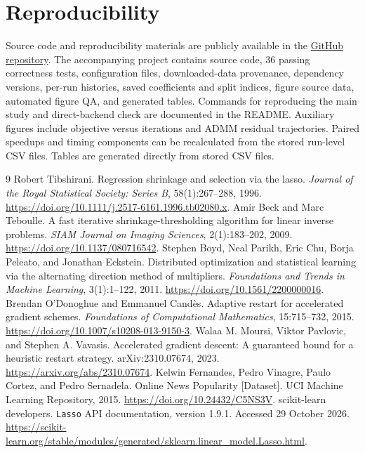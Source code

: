 \documentclass{article}
\begin{document}
\section*{Reproducibility}
Source code and reproducibility materials are publicly available in the \href{https://github.com/Yuchen-Wang-CHN/comp6704-lasso-optimization}{GitHub repository}.
The accompanying project contains source code, 36 passing correctness tests, configuration files, downloaded-data provenance, dependency versions, per-run histories, saved coefficients and split indices, figure source data, automated figure QA, and generated tables. Commands for reproducing the main study and direct-backend check are documented in the README. Auxiliary figures include objective versus iterations and ADMM residual trajectories. Paired speedups and timing components can be recalculated from the stored run-level CSV files. Tables are generated directly from stored CSV files.

\begin{thebibliography}{9}
Robert Tibshirani. Regression shrinkage and selection via the lasso. \emph{Journal of the Royal Statistical Society: Series B}, 58(1):267--288, 1996. \url{https://doi.org/10.1111/j.2517-6161.1996.tb02080.x}.
Amir Beck and Marc Teboulle. A fast iterative shrinkage-thresholding algorithm for linear inverse problems. \emph{SIAM Journal on Imaging Sciences}, 2(1):183--202, 2009. \url{https://doi.org/10.1137/080716542}.
Stephen Boyd, Neal Parikh, Eric Chu, Borja Peleato, and Jonathan Eckstein. Distributed optimization and statistical learning via the alternating direction method of multipliers. \emph{Foundations and Trends in Machine Learning}, 3(1):1--122, 2011. \url{https://doi.org/10.1561/2200000016}.
Brendan O'Donoghue and Emmanuel Cand\`es. Adaptive restart for accelerated gradient schemes. \emph{Foundations of Computational Mathematics}, 15:715--732, 2015. \url{https://doi.org/10.1007/s10208-013-9150-3}.
Walaa M. Moursi, Viktor Pavlovic, and Stephen A. Vavasis. Accelerated gradient descent: A guaranteed bound for a heuristic restart strategy. arXiv:2310.07674, 2023. \url{https://arxiv.org/abs/2310.07674}.
Kelwin Fernandes, Pedro Vinagre, Paulo Cortez, and Pedro Sernadela. Online News Popularity [Dataset]. UCI Machine Learning Repository, 2015. \url{https://doi.org/10.24432/C5NS3V}.
scikit-learn developers. \texttt{Lasso} API documentation, version 1.9.1. Accessed 29 October 2026. \url{https://scikit-learn.org/stable/modules/generated/sklearn.linear_model.Lasso.html}.
\end{thebibliography}
\end{document}
